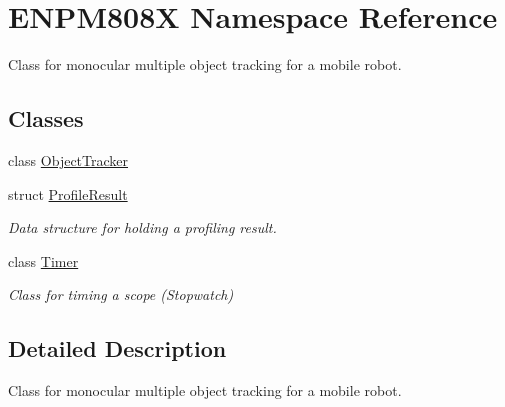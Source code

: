 \hypertarget{namespace_e_n_p_m808_x}{}\section{E\+N\+P\+M808X Namespace Reference}
\label{namespace_e_n_p_m808_x}


Class for monocular multiple object tracking for a mobile robot.  


\subsection*{Classes}
\begin{DoxyCompactItemize}
\item 
class \hyperlink{class_e_n_p_m808_x_1_1_object_tracker}{Object\+Tracker}
\item 
struct \hyperlink{struct_e_n_p_m808_x_1_1_profile_result}{Profile\+Result}
\begin{DoxyCompactList}\small\item\em Data structure for holding a profiling result. \end{DoxyCompactList}\item 
class \hyperlink{class_e_n_p_m808_x_1_1_timer}{Timer}
\begin{DoxyCompactList}\small\item\em Class for timing a scope (Stopwatch) \end{DoxyCompactList}\end{DoxyCompactItemize}


\subsection{Detailed Description}
Class for monocular multiple object tracking for a mobile robot. 